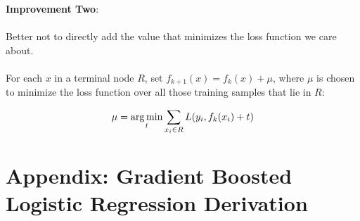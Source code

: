 %
\begin{frame}
\textbf{Improvement Two}:\\~\\

Better not to directly add the value that minimizes the loss function we care about.\\~\\

For each $x$ in a terminal node $R$, set $f_{k+1}(x) = f_k(x) + \mu$, where $\mu$ is chosen to minimize the loss function over all those training samples that lie in $R$:

$$ \mu = \operatorname*{arg\,min}_t \sum_{x_i \in R} L(y_i, f_k(x_i) + t) $$
\end{frame} 


\section{Appendix: Gradient Boosted Logistic Regression Derivation}

